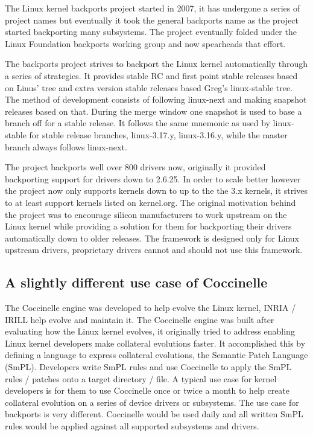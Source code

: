 \documentclass[a4paper,10pt]{article}
\begin{document}
The Linux kernel backports project started in 2007, it has undergone
a series of project names but eventually it took the general backports
name as the project started backporting many subsystems. The project
eventually folded under the Linux Foundation backports working group
and now spearheads that effort.

The backports project strives to backport the Linux kernel automatically
through a series of strategies. It provides stable RC and first point
stable releases based on Linus' tree and extra version stable releases
based Greg's linux-stable tree. The method of development consists
of following linux-next and making snapshot releases based on that. During the
merge window one snapshot is used to base a branch off for a stable
release. It follows the same mnemonic as used by linux-stable for stable
release branches, linux-3.17.y, linux-3.16.y, while the master branch always
follows linux-next.

The project backports well over 800 drivers now, originally it provided
backporting support for drivers down to 2.6.25. In order to scale better
however the project now only supports kernels down to up to the the 3.x
kernels, it strives to at least support kernels listed on kernel.org.
The original motivation behind the project was to encourage
silicon manufacturers to work upstream on the Linux kernel while providing a
solution for them for backporting their drivers automatically down to older
releases.  The framework is designed only for Linux upstream drivers,
proprietary drivers cannot and should not use this framework.

\subsection{A slightly different use case of Coccinelle}

The Coccinelle engine was developed to help evolve the Linux kernel,
INRIA / IRILL help evolve and maintain it. The Coccinelle engine was
built after evaluating how the Linux kernel evolves, it originally
tried to address enabling Linux kernel developers make collateral
evolutions faster. It accomplished this by defining a language to
express collateral evolutions, the Semantic Patch Language (SmPL).
Developers write SmPL rules and use Coccinelle to apply the SmPL
rules / patches onto a target directory / file. A typical use case
for kernel developers is for them to use Coccinelle once or twice a
month to help create collateral evolution on a series of device
drivers or subsystems. The use case for backports is very different.
Coccinelle would be used daily and all written SmPL rules would be
applied against all supported subsystems and drivers.
\end{document}
